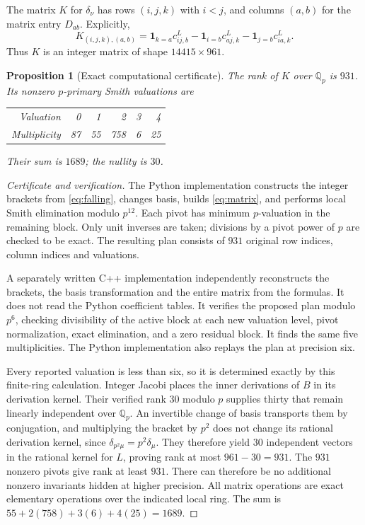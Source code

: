\documentclass[11pt]{article}
\newtheorem{proposition}[theorem]{Proposition}
\theoremstyle{definition}\newtheorem{definition}[theorem]{Definition}
\theoremstyle{remark}\newtheorem{remark}[theorem]{Remark}
\newcommand{\Qp}{\mathbb Q_p}
\begin{document}
The matrix $K$ for $\delta_\nu$ has rows $(i,j,k)$ with $i<j$, and columns
$(a,b)$ for the matrix entry $D_{ab}$. Explicitly,
\begin{equation}\label{eq:matrix}
 K_{(i,j,k),(a,b)}
 =\mathbf1_{k=a}c^L_{ij,b}
  -\mathbf1_{i=b}c^L_{aj,k}
  -\mathbf1_{j=b}c^L_{ia,k}.
\end{equation}
Thus $K$ is an integer matrix of shape $14415\times961$.

\begin{proposition}[Exact computational certificate]\label{prop:smith}
The rank of $K$ over $\Qp$ is $931$. Its nonzero $p$-primary Smith
valuations are
\begin{center}
\begin{tabular}{rrrrrr}
\toprule Valuation & 0 & 1 & 2 & 3 & 4 \\
Multiplicity & 87 & 55 & 758 & 6 & 25 \\
\bottomrule
\end{tabular}
\end{center}
Their sum is $1689$; the nullity is $30$.
\end{proposition}
\begin{proof}[Certificate and verification]
The Python implementation constructs the integer brackets from
\eqref{eq:falling}, changes basis, builds \eqref{eq:matrix}, and performs
local Smith elimination modulo $p^{12}$. Each pivot has minimum $p$-valuation
in the remaining block. Only unit inverses are taken; divisions by a
pivot power of $p$ are checked to be exact. The resulting plan consists
of $931$ original row indices, column indices and valuations.

A separately written C++ implementation independently reconstructs the
brackets, the basis transformation and the entire matrix from the formulas.
It does not read the Python coefficient tables. It verifies the proposed
plan modulo $p^6$, checking divisibility of the active block at each new
valuation level, pivot normalization, exact elimination, and a zero residual
block. It finds the same five multiplicities. The Python implementation
also replays the plan at precision six.

Every reported valuation is less than six, so it is determined exactly by
this finite-ring calculation. Integer Jacobi places the inner derivations
of $B$ in its derivation kernel. Their verified rank $30$ modulo $p$ supplies
thirty that remain linearly independent over $\Qp$. An invertible change of basis
transports them by conjugation, and multiplying the bracket by $p^2$ does
not change its rational derivation kernel, since
$\delta_{p^2\mu}=p^2\delta_\mu$. They therefore yield $30$ independent
vectors in the rational kernel for $L$, proving rank at most $961-30=931$.
The $931$ nonzero pivots give rank at least $931$. There can therefore be
no additional nonzero invariants hidden at higher precision. All matrix
operations are exact elementary operations over the indicated local ring.
The sum is $55+2(758)+3(6)+4(25)=1689$.
\end{proof}
\end{document}
